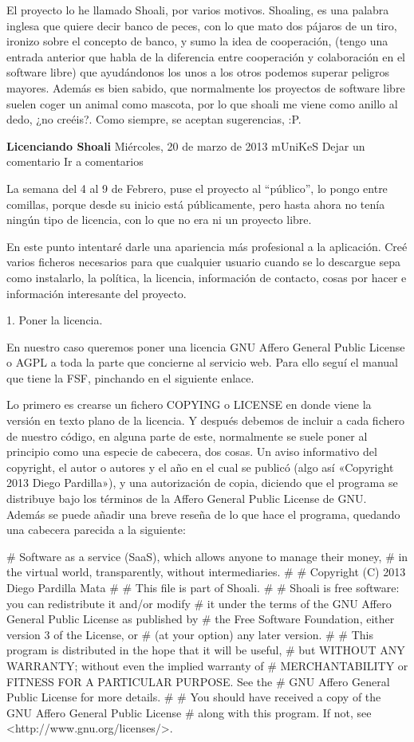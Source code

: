 \documentclass[a4paper, 12pt]{book}
\begin{document}
El proyecto lo he llamado Shoali, por varios motivos. Shoaling, es una palabra inglesa que quiere decir banco de peces, con lo que mato dos pájaros de un tiro, ironizo sobre el concepto de banco, y sumo la idea de cooperación, (tengo una entrada anterior que habla de la diferencia entre cooperación y colaboración en el software libre) que ayudándonos los unos a los otros podemos superar peligros mayores. Además es bien sabido, que normalmente los proyectos de software libre suelen coger un animal como mascota, por lo que shoali me viene como anillo al dedo, ¿no creéis?. Como siempre, se aceptan sugerencias, :P.


\textbf{Licenciando Shoali}
Miércoles, 20 de marzo de 2013 mUniKeS  Dejar un comentario Ir a comentarios

La semana del 4 al 9 de Febrero, puse el proyecto al “público”, lo pongo entre comillas, porque desde su inicio está públicamente, pero hasta ahora no tenía ningún tipo de licencia, con lo que no era ni un proyecto libre.

En este punto intentaré darle una apariencia más profesional a la aplicación. Creé varios ficheros necesarios para que cualquier usuario cuando se lo descargue sepa como instalarlo, la política, la licencia, información de contacto, cosas por hacer e información interesante del proyecto.

1. Poner la licencia.

En nuestro caso queremos poner una licencia GNU Affero General Public License o AGPL a toda la parte que concierne al servicio web. Para ello seguí el manual que tiene la FSF, pinchando en el siguiente enlace.

Lo primero es crearse un fichero COPYING o LICENSE en donde viene la versión en texto plano de la licencia. Y después debemos de incluir a cada fichero de nuestro código, en alguna parte de este, normalmente se suele poner al principio como una especie de cabecera, dos cosas. Un aviso informativo del copyright, el autor o autores y el año en el cual se publicó (algo así «Copyright 2013 Diego Pardilla»), y una autorización de copia, diciendo que el programa se distribuye bajo los términos de la Affero General Public License de GNU. Además se puede añadir una breve reseña de lo que hace el programa, quedando una cabecera parecida a la siguiente:

#    Software as a service (SaaS), which allows anyone to manage their money,
#    in the virtual world, transparently, without intermediaries.
#
#    Copyright (C) 2013 Diego Pardilla Mata
#
#    This file is part of Shoali.
#
#    Shoali is free software: you can redistribute it and/or modify
#    it under the terms of the GNU Affero General Public License as published by
#    the Free Software Foundation, either version 3 of the License, or
#    (at your option) any later version.
#
#    This program is distributed in the hope that it will be useful,
#    but WITHOUT ANY WARRANTY; without even the implied warranty of
#    MERCHANTABILITY or FITNESS FOR A PARTICULAR PURPOSE.  See the
#    GNU Affero General Public License for more details.
#
#    You should have received a copy of the GNU Affero General Public License
#    along with this program.  If not, see <http://www.gnu.org/licenses/>.
\end{document}

